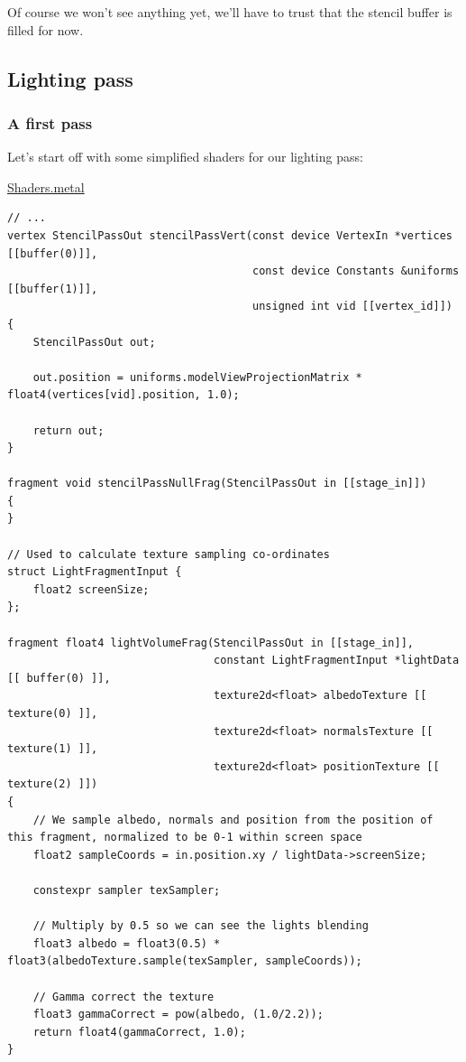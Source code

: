 \documentclass[11pt]{article}
\begin{document}
Of course we won't see anything yet, we'll have to trust that the stencil buffer
is filled for now.

\subsection*{Lighting pass}
\label{sec:org10535d5}

\subsubsection*{A first pass}
\label{sec:orgfe12f1b}

Let's start off with some simplified shaders for our lighting pass:

\uline{Shaders.metal}
\begin{verbatim}
// ...
vertex StencilPassOut stencilPassVert(const device VertexIn *vertices [[buffer(0)]],
                                      const device Constants &uniforms [[buffer(1)]],
                                      unsigned int vid [[vertex_id]]) {
    StencilPassOut out;

    out.position = uniforms.modelViewProjectionMatrix * float4(vertices[vid].position, 1.0);

    return out;
}

fragment void stencilPassNullFrag(StencilPassOut in [[stage_in]])
{
}

// Used to calculate texture sampling co-ordinates
struct LightFragmentInput {
    float2 screenSize;
};

fragment float4 lightVolumeFrag(StencilPassOut in [[stage_in]],
                                constant LightFragmentInput *lightData [[ buffer(0) ]],
                                texture2d<float> albedoTexture [[ texture(0) ]],
                                texture2d<float> normalsTexture [[ texture(1) ]],
                                texture2d<float> positionTexture [[ texture(2) ]])
{
    // We sample albedo, normals and position from the position of this fragment, normalized to be 0-1 within screen space
    float2 sampleCoords = in.position.xy / lightData->screenSize;

    constexpr sampler texSampler;

    // Multiply by 0.5 so we can see the lights blending
    float3 albedo = float3(0.5) * float3(albedoTexture.sample(texSampler, sampleCoords));

    // Gamma correct the texture
    float3 gammaCorrect = pow(albedo, (1.0/2.2));
    return float4(gammaCorrect, 1.0);
}
\end{verbatim}
\end{document}

